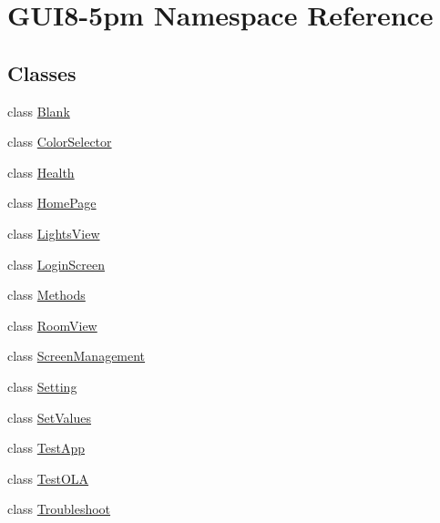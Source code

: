 \hypertarget{namespaceGUI8-5pm}{}\section{G\+U\+I8-\/5pm Namespace Reference}
\label{namespaceGUI8-5pm}
\subsection*{Classes}
\begin{DoxyCompactItemize}
\item 
class \hyperlink{classGUI8-5pm_1_1Blank}{Blank}
\item 
class \hyperlink{classGUI8-5pm_1_1ColorSelector}{Color\+Selector}
\item 
class \hyperlink{classGUI8-5pm_1_1Health}{Health}
\item 
class \hyperlink{classGUI8-5pm_1_1HomePage}{Home\+Page}
\item 
class \hyperlink{classGUI8-5pm_1_1LightsView}{Lights\+View}
\item 
class \hyperlink{classGUI8-5pm_1_1LoginScreen}{Login\+Screen}
\item 
class \hyperlink{classGUI8-5pm_1_1Methods}{Methods}
\item 
class \hyperlink{classGUI8-5pm_1_1RoomView}{Room\+View}
\item 
class \hyperlink{classGUI8-5pm_1_1ScreenManagement}{Screen\+Management}
\item 
class \hyperlink{classGUI8-5pm_1_1Setting}{Setting}
\item 
class \hyperlink{classGUI8-5pm_1_1SetValues}{Set\+Values}
\item 
class \hyperlink{classGUI8-5pm_1_1TestApp}{Test\+App}
\item 
class \hyperlink{classGUI8-5pm_1_1TestOLA}{Test\+O\+LA}
\item 
class \hyperlink{classGUI8-5pm_1_1Troubleshoot}{Troubleshoot}
\end{DoxyCompactItemize}
